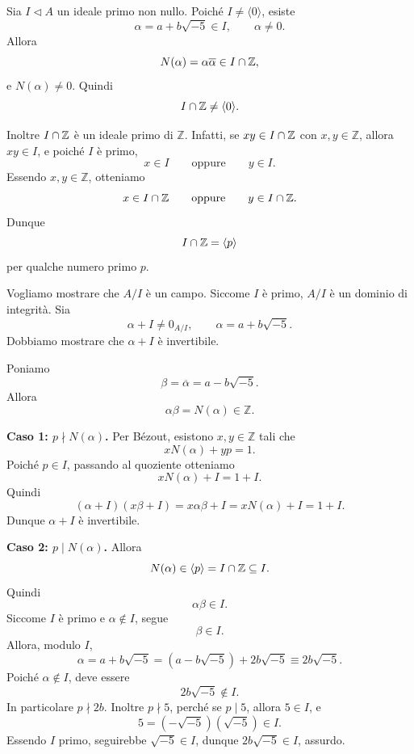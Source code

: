 \documentclass[a4paper]{article}
\begin{document}
\begin{radioactive}
\begin{snippetproof}{}
    Sia \(I\triangleleft A\) un ideale primo non nullo.
    Poiché \(I\neq \langle 0 \rangle\), esiste
    \[
        \alpha=a+b\sqrt{-5}\in I,
        \qquad
        \alpha\neq 0.
    \]
    Allora
    \[
        N(\alpha)=\alpha\overline{\alpha}\in I\cap \mathbb{Z},
    \]
    e \(N(\alpha)\neq 0\). Quindi
    \[
        I\cap \mathbb{Z}\neq \langle 0 \rangle.
    \]

    Inoltre \(I\cap\mathbb{Z}\) è un ideale primo di \(\mathbb{Z}\).
    Infatti, se \(xy\in I\cap\mathbb{Z}\) con \(x,y\in\mathbb{Z}\), allora \(xy\in I\), e poiché \(I\) è primo,
    \[
        x\in I
        \qquad
        \text{oppure}
        \qquad
        y\in I.
    \]
    Essendo \(x,y\in\mathbb{Z}\), otteniamo
    \[
        x\in I\cap\mathbb{Z}
        \qquad
        \text{oppure}
        \qquad
        y\in I\cap\mathbb{Z}.
    \]
    Dunque
    \[
        I\cap\mathbb{Z}=\langle p \rangle
    \]
    per qualche numero primo \(p\).

    Vogliamo mostrare che \(A/I\) è un campo. Siccome \(I\) è primo, \(A/I\) è un dominio di integrità.
    Sia
    \[
        \alpha+I\neq 0_{A/I},
        \qquad
        \alpha=a+b\sqrt{-5}.
    \]
    Dobbiamo mostrare che \(\alpha+I\) è invertibile.

    Poniamo
    \[
        \beta=\overline{\alpha}=a-b\sqrt{-5}.
    \]
    Allora
    \[
        \alpha\beta=N(\alpha)\in\mathbb{Z}.
    \]

    \textbf{Caso 1: \(p\nmid N(\alpha)\).}
    Per Bézout, esistono \(x,y\in\mathbb{Z}\) tali che
    \[
        xN(\alpha)+yp=1.
    \]
    Poiché \(p\in I\), passando al quoziente otteniamo
    \[
        xN(\alpha)+I=1+I.
    \]
    Quindi
    \[
        (\alpha+I)(x\beta+I)
        =
        x\alpha\beta+I
        =
        xN(\alpha)+I
        =
        1+I.
    \]
    Dunque \(\alpha+I\) è invertibile.

    \textbf{Caso 2: \(p\mid N(\alpha)\).}
    Allora
    \[
        N(\alpha)\in\langle p \rangle=I\cap\mathbb{Z}\subseteq I.
    \]
    Quindi
    \[
        \alpha\beta\in I.
    \]
    Siccome \(I\) è primo e \(\alpha\notin I\), segue
    \[
        \beta\in I.
    \]
    Allora, modulo \(I\),
    \[
        \alpha
        =
        a+b\sqrt{-5}
        =
        (a-b\sqrt{-5})+2b\sqrt{-5}
        \equiv
        2b\sqrt{-5}.
    \]
    Poiché \(\alpha\notin I\), deve essere
    \[
        2b\sqrt{-5}\notin I.
    \]
    In particolare \(p\nmid 2b\). Inoltre \(p\nmid 5\), perché se \(p\mid 5\), allora \(5\in I\), e
    \[
        5=(-\sqrt{-5})(\sqrt{-5})\in I.
    \]
    Essendo \(I\) primo, seguirebbe \(\sqrt{-5}\in I\), dunque \(2b\sqrt{-5}\in I\), assurdo.


\end{snippetproof}
\end{radioactive}
\end{document}
